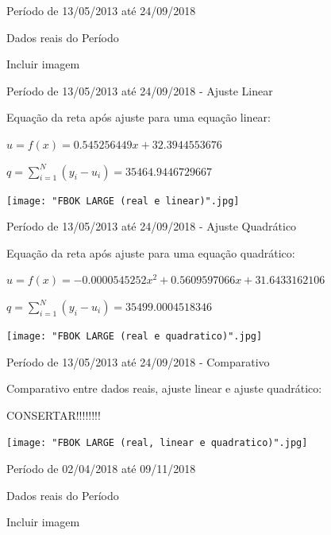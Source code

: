 \documentclass[10pt]{beamer}
\begin{document}
\begin{frame}{Período de 13/05/2013 até 24/09/2018}

  Dados reais do Período
  
  Incluir imagem
\end{frame}

\begin{frame}{Período de 13/05/2013 até 24/09/2018 - Ajuste Linear}

  Equação da reta após ajuste para uma equação linear:
  \begin{center}
  $u = f(x) = 0.545256449x + 32.3944553676$
  
  $q = \sum_{i=1}^{N} (y_{i}-u_{i}) = 35464.9446729667$
  \end{center}
  
  \begin{center}
    \texttt{[image: "FBOK LARGE (real e linear)".jpg]}
  \end{center}
\end{frame}

\begin{frame}{Período de 13/05/2013 até 24/09/2018 - Ajuste Quadrático}

  Equação da reta após ajuste para uma equação quadrático:
  \begin{center}
  $u = f(x) = -0.0000545252x^2 + 0.5609597066x + 31.6433162106$
  
  $q = \sum_{i=1}^{N} (y_{i}-u_{i}) = 35499.0004518346$
  \end{center}
  
  \begin{center}
    \texttt{[image: "FBOK LARGE (real e quadratico)".jpg]}
  \end{center}
\end{frame}

\begin{frame}{Período de 13/05/2013 até 24/09/2018 - Comparativo}

  Comparativo entre dados reais, ajuste linear e ajuste quadrático:
  
  CONSERTAR!!!!!!!!
  \begin{center}
    \texttt{[image: "FBOK LARGE (real, linear e quadratico)".jpg]}
  \end{center}
\end{frame}

\begin{frame}{Período de 02/04/2018 até 09/11/2018}

  Dados reais do Período
  
  Incluir imagem
\end{frame}
\end{document}
